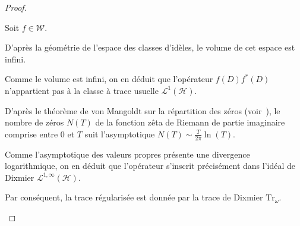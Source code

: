\documentclass[Riemann_Hypothesis.tex]{subfiles}
\begin{document}
\begin{proof}
    \begin{part_proof}
        Soit $f \in \mathcal{W}$. \par
        D'après la géométrie de l'espace des classes d'idèles, le volume de cet espace est 
        infini. \par
        Comme le volume est infini, on en déduit que l'opérateur $f(D)f^*(D)$ n'appartient 
        pas à la classe à trace usuelle $\mathcal{L}^1(\mathcal{H})$. \par
        D'après le théorème de von Mangoldt sur la répartition des zéros 
        (voir~\cite{von-Manglot_tenenbaum2015_intro}), le nombre de zéros $N(T)$ de la 
        fonction zêta de Riemann de partie imaginaire comprise entre $0$ et $T$ suit 
        l'asymptotique $N(T) \sim \frac{T}{2\pi}\ln(T)$. \par
        Comme l'asymptotique des valeurs propres présente une divergence logarithmique, 
        on en déduit que l'opérateur s'inscrit précisément dans l'idéal de Dixmier 
        $\mathcal{L}^{1,\infty}(\mathcal{H})$. \par
        Par conséquent, la trace régularisée est donnée par la trace de Dixmier 
        $\mathrm{Tr}_\omega$.
    \end{part_proof}


\end{proof}
\end{document}
